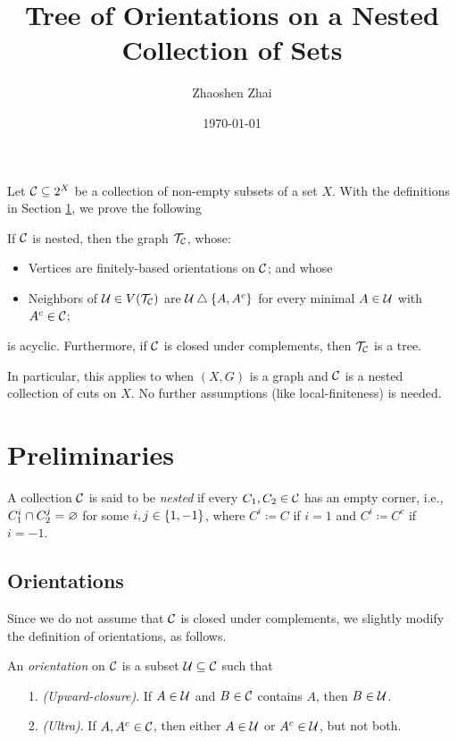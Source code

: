 \documentclass{amsart}
\begin{document}
    \title{Tree of Orientations on a Nested Collection of Sets}
    \author{Zhaoshen Zhai}
    \date{\today}
    \maketitle

    Let $\mc{C}\subseteq2^X$ be a collection of non-empty subsets of a set $X$. With the definitions in Section \ref{prelim}, we prove the following
    \begin{mainTheorem}\label{main}
        If $\mc{C}$ is nested, then the graph $\mc{T}_\mc{C}$, whose:
        \begin{itemize}
            \item Vertices are finitely-based orientations on $\mc{C}$; and whose
            \item Neighbors of $\mc{U}\in V(\mc{T}_\mc{C})$ are $\mc{U}\symdiff\l\{A,A^c\r\}$ for every minimal $A\in\mc{U}$ with $A^c\in\mc{C}$;
        \end{itemize}
        is acyclic. Furthermore, if $\mc{C}$ is closed under complements, then $\mc{T}_\mc{C}$ is a tree.
    \end{mainTheorem}

    In particular, this applies to when $(X,G)$ is a graph and $\mc{C}$ is a nested collection of cuts on $X$. No further assumptions (like local-finiteness) is needed.

    \section{Preliminaries}\label{prelim}

    \begin{definition}
        A collection $\mc{C}$ is said to be \textit{nested} if every $C_1,C_2\in\mc{C}$ has an empty corner, i.e., $C_1^i\cap C_2^j=\em$ for some $i,j\in\l\{1,-1\r\}$, where $C^i\coloneqq C$ if $i=1$ and $C^i\coloneqq C^c$ if $i=-1$.
    \end{definition}

    \subsection{Orientations}

    Since we do not assume that $\mc{C}$ is closed under complements, we slightly modify the definition of orientations, as follows.

    \begin{definition}
        An \textit{orientation} on $\mc{C}$ is a subset $\mc{U}\subseteq\mc{C}$ such that
        \begin{enumerate}
            \item[1.] \textit{(Upward-closure)}. If $A\in\mc{U}$ and $B\in\mc{C}$ contains $A$, then $B\in\mc{U}$.
            \item[2.] \textit{(Ultra)}. If $A,A^c\in\mc{C}$, then either $A\in\mc{U}$ or $A^c\in\mc{U}$, but not both.
        \end{enumerate}
    \end{definition}
\end{document}
